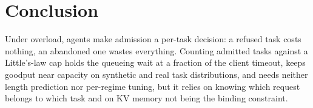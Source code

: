 \documentclass[10pt,twocolumn,letterpaper]{article}
\begin{document}
\section{Conclusion}
Under overload, agents make admission a per-task decision: a refused task costs nothing, an abandoned one wastes everything. Counting admitted tasks against a Little's-law cap holds the queueing wait at a fraction of the client timeout, keeps goodput near capacity on synthetic and real task distributions, and needs neither length prediction nor per-regime tuning, but it relies on knowing which request belongs to which task and on KV memory not being the binding constraint.



\end{document}
